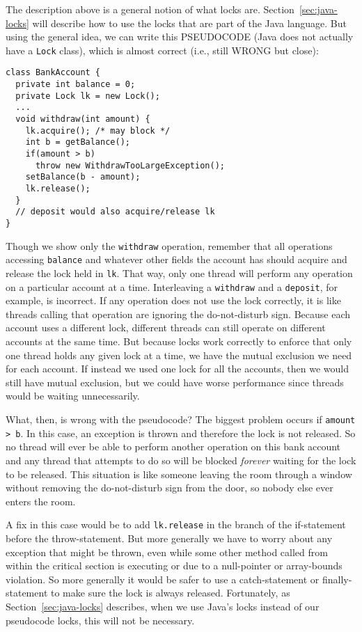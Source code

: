 \documentclass[10pt]{article}
\begin{document}
The description above is a general notion of what locks are.
Section~\ref{sec:java-locks} will describe how to use the locks that
are part of the Java language.  But using the general idea, we can
write this PSEUDOCODE (Java does not actually have a {\tt Lock} class),
which is almost correct (i.e., still WRONG but close):
\begin{verbatim}
class BankAccount {
  private int balance = 0;
  private Lock lk = new Lock();
  ...
  void withdraw(int amount) {
    lk.acquire(); /* may block */
    int b = getBalance();
    if(amount > b)
      throw new WithdrawTooLargeException();
    setBalance(b - amount);
    lk.release(); 
  }
  // deposit would also acquire/release lk
}
\end{verbatim}
Though we show only the {\tt withdraw} operation, remember that all
operations accessing {\tt balance} and whatever other fields the
account has should acquire and release the lock held in {\tt lk}.  That way,
only one thread will perform any operation on a particular account at
a time.  Interleaving a {\tt withdraw} and a {\tt deposit}, for
example, is incorrect.  If any operation does not use the lock
correctly, it is like threads calling that operation are ignoring the
do-not-disturb sign.  Because each account uses a different lock,
different threads can still operate on different accounts at the same
time.  But because locks work correctly to enforce that only one
thread holds any given lock at a time, we have the mutual exclusion we
need for each account.  If instead we used one lock for all the
accounts, then we would still have mutual exclusion, but we could have
worse performance since threads would be waiting unnecessarily.

What, then, is wrong with the pseudocode?  The biggest problem occurs if
{\tt amount > b}.  In this case, an exception is thrown and therefore
the lock is not released.  So no thread will ever be able to perform
another operation on this bank account and any thread that attempts to
do so will be blocked \emph{forever} waiting for the lock to be
released.  This situation is like someone leaving the room
through a window without removing the do-not-disturb sign from the door, so nobody
else ever enters the room.

A fix in this case would be to add {\tt lk.release} in the branch of
the if-statement before the throw-statement.  But more generally we
have to worry about any exception that might be thrown, even while
some other method called from within the critical section is executing
or due to a null-pointer or array-bounds violation.  So more generally
it would be safer to use a catch-statement or finally-statement to make
sure the lock is always released.  Fortunately, as
Section~\ref{sec:java-locks} describes, when we use Java's locks
instead of our pseudocode locks, this will not be necessary.
\end{document}
